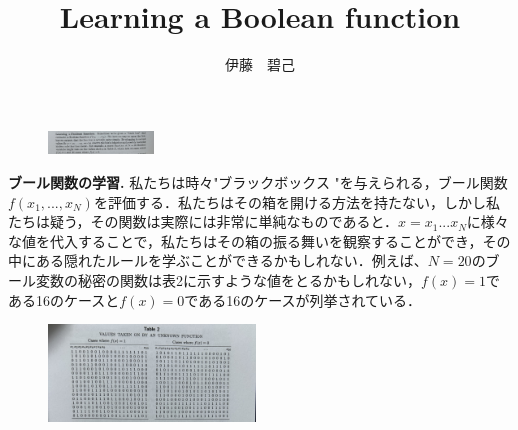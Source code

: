 \documentclass[dvipdfmx,a4paper,12pt]{jsarticle}
\title{Learning a Boolean function}
\author{伊藤　碧己}
\begin{document}
\maketitle


\begin{figure}[htbp]
  \centering
  \includegraphics[width=28mm,angle=270]{images/1.jpg}
\end{figure}
\textbf{ブール関数の学習.}
私たちは時々"ブラックボックス "を与えられる，ブール関数$f(x_{1},...,x_{N})$を評価する．私たちはその箱を開ける方法を持たない，しかし私たちは疑う，その関数は実際には非常に単純なものであると．$x = x_{1}...x_{N}$に様々な値を代入することで，私たちはその箱の振る舞いを観察することができ，その中にある隠れたルールを学ぶことができるかもしれない．例えば、$N = 20$のブール変数の秘密の関数は表2に示すような値をとるかもしれない，$f(x) = 1$である16のケースと$f(x) = 0$である16のケースが列挙されている．
\begin{figure}[htbp]
  \centering
  \includegraphics[width=55mm,angle=270]{images/table2.jpg}
\end{figure}
\end{document}
